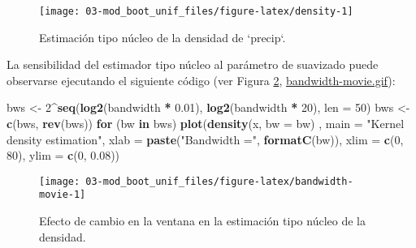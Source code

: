 \documentclass[]{book}
\newenvironment{Shaded}{\begin{snugshade}}{\end{snugshade}}
\newcommand{\KeywordTok}[1]{\textcolor[rgb]{0.13,0.29,0.53}{\textbf{#1}}}
\newcommand{\DataTypeTok}[1]{\textcolor[rgb]{0.13,0.29,0.53}{#1}}
\newcommand{\DecValTok}[1]{\textcolor[rgb]{0.00,0.00,0.81}{#1}}
\newcommand{\FloatTok}[1]{\textcolor[rgb]{0.00,0.00,0.81}{#1}}
\newcommand{\StringTok}[1]{\textcolor[rgb]{0.31,0.60,0.02}{#1}}
\newcommand{\ControlFlowTok}[1]{\textcolor[rgb]{0.13,0.29,0.53}{\textbf{#1}}}
\newcommand{\OperatorTok}[1]{\textcolor[rgb]{0.81,0.36,0.00}{\textbf{#1}}}
\newcommand{\NormalTok}[1]{#1}
\theoremstyle{break}
\theoremstyle{definition}
\theoremstyle{definition}
\theoremstyle{definition}
\theoremstyle{remark}
\begin{document}
\begin{figure}[!htb]

{\centering \texttt{[image: 03-mod\_boot\_unif\_files/figure-latex/density-1]} 

}

\caption{Estimación tipo núcleo de la densidad de `precip`. }\label{fig:density}
\end{figure}

La sensibilidad del estimador tipo núcleo al parámetro de suavizado
puede observarse ejecutando el siguiente código (ver Figura
\ref{fig:bandwidth-movie},
\href{./bandwidth-movie.gif}{bandwidth-movie.gif}):

\begin{Shaded}
\begin{Highlighting}[]
\NormalTok{bws <-}\StringTok{ }\DecValTok{2}\OperatorTok{^}\KeywordTok{seq}\NormalTok{(}\KeywordTok{log2}\NormalTok{(bandwidth }\OperatorTok{*}\StringTok{ }\FloatTok{0.01}\NormalTok{), }\KeywordTok{log2}\NormalTok{(bandwidth }\OperatorTok{*}\StringTok{ }\DecValTok{20}\NormalTok{), }\DataTypeTok{len =} \DecValTok{50}\NormalTok{)}
\NormalTok{bws <-}\StringTok{ }\KeywordTok{c}\NormalTok{(bws, }\KeywordTok{rev}\NormalTok{(bws))}
\ControlFlowTok{for}\NormalTok{ (bw }\ControlFlowTok{in}\NormalTok{ bws)}
  \KeywordTok{plot}\NormalTok{(}\KeywordTok{density}\NormalTok{(x, }\DataTypeTok{bw =}\NormalTok{ bw) , }\DataTypeTok{main =} \StringTok{"Kernel density estimation"}\NormalTok{, }
         \DataTypeTok{xlab =} \KeywordTok{paste}\NormalTok{(}\StringTok{"Bandwidth ="}\NormalTok{, }\KeywordTok{formatC}\NormalTok{(bw)), }
         \DataTypeTok{xlim =} \KeywordTok{c}\NormalTok{(}\DecValTok{0}\NormalTok{, }\DecValTok{80}\NormalTok{), }\DataTypeTok{ylim =} \KeywordTok{c}\NormalTok{(}\DecValTok{0}\NormalTok{, }\FloatTok{0.08}\NormalTok{))}
\end{Highlighting}
\end{Shaded}

\begin{figure}[!htb]

{\centering \texttt{[image: 03-mod\_boot\_unif\_files/figure-latex/bandwidth-movie-1]} 

}

\caption{Efecto de cambio en la ventana en la estimación tipo núcleo de la densidad.}\label{fig:bandwidth-movie}
\end{figure}
\end{document}
